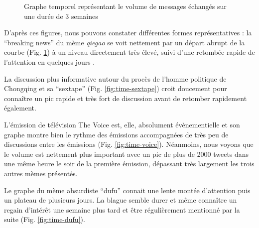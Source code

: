 \begin{figure}[ht]
{      \label{fig:time-qiegao}
    }
    \newline
    \caption{
      Graphe temporel repr\'esentant le volume de messages \'echang\'es sur une dur\'ee de 3 semaines    
    }
\end{figure}
\clearpage

D{\textquoteright}apr\`es ces figures, nous pouvons constater diff\'erentes formes repr\'esentatives : la {\textquotedblleft}breaking news{\textquotedblright} du m\`eme \textit{qiegao} se voit nettement par un d\'epart abrupt de la courbe (Fig. \ref{fig:time-qiegao}) \`a un niveau directement tr\`es \'elev\'e, suivi d{\textquoteright}une retomb\'ee rapide de l{\textquoteright}attention en quelques jours .  

La discussion plus informative autour du proc\`es de l{\textquoteright}homme politique de Chongqing et sa {\textquotedblleft}sextape{\textquotedblright} (Fig. \ref{fig:time-sextape}) croit doucement pour conna\^itre un pic rapide et tr\`es fort de discussion avant de retomber rapidement \'egalement.  

L{\textquoteright}\'emission de t\'el\'evision The Voice est, elle, absolument \'ev\`enementielle et son graphe montre bien le rythme des \'emissions accompagn\'ees de tr\`es peu de discussions entre les \'emissions (Fig. \ref{fig:time-voice}). N\'eanmoins, nous voyons que le volume est nettement plus important avec un pic de plus de 2000 tweets dans une m\^eme heure le soir de la premi\`ere \'emission, d\'epassant tr\`es largement les trois autres m\`emes pr\'esent\'es.  

Le graphe du m\`eme absurdiste {\textquotedblleft}dufu{\textquotedblright} connait une lente mont\'ee d{\textquoteright}attention puis un plateau de plusieurs jours. La blague semble durer et m\^eme conna\^itre un regain d{\textquoteright}int\'er\^et une semaine plus tard et \^etre r\'eguli\`erement mentionn\'e par la suite (Fig. \ref{fig:time-dufu}).  

